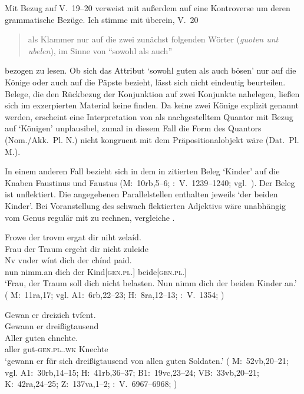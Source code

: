 Mit Bezug auf V.~19--20 verweist \citet[26, Anm.~45]{weis2022} mit \citet[55,
Anm.~87]{dickhutbielsky2015} außerdem auf eine Kontroverse um deren
grammatische Bezüge. Ich stimme mit \citet[239]{haupt2019} überein, V.~20
\blockquote{als Klammer nur auf die zwei zunächst folgenden Wörter
(\textit{guoten unt ubelen}), im Sinne von \enquote{sowohl als auch}} bezogen
zu lesen. Ob sich das Attribut  `sowohl guten als
auch bösen' nur auf die Könige oder auch auf die Päpste bezieht, lässt sich
nicht eindeutig beurteilen. Belege, die den Rückbezug der Konjunktion
 auf zwei Konjunkte nahelegen, ließen sich im exzerpierten Material
keine finden. Da keine zwei Könige explizit genannt werden, erscheint eine
Interpretation von  als nachgestelltem Quantor mit Bezug auf
 `Königen' unplausibel, zumal in diesem Fall die Form des
Quantors (Nom./Akk.~Pl. N.) nicht kongruent mit dem Präpositionalobjekt wäre
(Dat.~Pl. M.).

In einem anderen Fall bezieht sich in dem in  zitierten
Beleg  `Kinder' auf die Knaben Faustinus und Faustus (M:~10rb,5--6;
\KC:~V.~1239--1240; vgl.~\cite[104]{schroeder1895}). Der Beleg ist unflektiert.
Die angegebenen Parallelstellen enthalten jeweils  `der
beiden Kinder'. Bei Voranstellung des schwach flektierten Adjektivs wäre
unabhängig vom Genus regulär mit  zu rechnen, vergleiche
.

\begin{exe}
\ex \label{ex:chindpaid}
\begin{xlist}
	\ex \label{ex:chindpaid_1}
		\gll Frowe der trovm ergat dir niht zelaíd. \\
			Frau der Traum ergeht dir nicht zuleide \\
	\sn \gll Nv {vnder wínt} dich der chínd paid. \\
			nun nimm.an dich der Kind[\textsc{gen.pl.\NeutM}]
			beide[\textsc{gen.pl.\NeutM}] \\
		\trans `Frau, der Traum soll dich nicht belasten. Nun nimm dich der
			beiden Kinder an.'
			(%
				M:~11ra,17; vgl.
				A1:~6rb,22--23;
				H:~8ra,12--13;
				\KC:~V.~1354;
				\cite[106]{schroeder1895}%
			)

	\ex \label{ex:chindpaid_2}
		\gll Gewan er {dreizich tvſent}. \\
			Gewann er dreißigtausend \\
	\sn \gll Aller guten chnehte. \\
			aller gut-\textsc{gen.pl.\MascM.wk} Knechte \\
		\trans `gewann er  für sich dreißigtausend
			von allen guten Soldaten.'
			(%
				M:~52vb,20--21; vgl.
				A1:~30rb,14--15;
				H:~41rb,36--37;
				B1:~19vc,23--24;
				VB:~33vb,20--21;
				K:~42ra,24--25;
				Z:~137va,1--2;
				\KC:~V.~6967--6968;
				\cite[209]{schroeder1895}%
			)
\end{xlist}
\end{exe}

